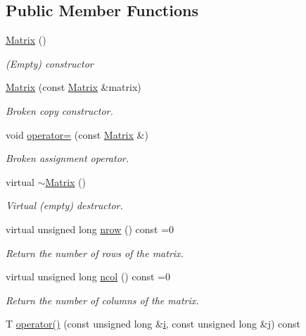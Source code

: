\subsection*{Public Member Functions}
\begin{DoxyCompactItemize}
\item 
\hyperlink{classoomph_1_1Matrix_ab414a0bf8e2658fc30d2c516f3bf4837}{Matrix} ()
\begin{DoxyCompactList}\small\item\em (Empty) constructor \end{DoxyCompactList}\item 
\hyperlink{classoomph_1_1Matrix_af6fb4df80b38414670a17080ca25aa4b}{Matrix} (const \hyperlink{classoomph_1_1Matrix}{Matrix} \&matrix)
\begin{DoxyCompactList}\small\item\em Broken copy constructor. \end{DoxyCompactList}\item 
void \hyperlink{classoomph_1_1Matrix_a9220e1bb01e5c77c4d4c2e6cb6865277}{operator=} (const \hyperlink{classoomph_1_1Matrix}{Matrix} \&)
\begin{DoxyCompactList}\small\item\em Broken assignment operator. \end{DoxyCompactList}\item 
virtual \hyperlink{classoomph_1_1Matrix_a3bc2eeb0940268de5252a9234d126f11}{$\sim$\+Matrix} ()
\begin{DoxyCompactList}\small\item\em Virtual (empty) destructor. \end{DoxyCompactList}\item 
virtual unsigned long \hyperlink{classoomph_1_1Matrix_ac366ca5324d3e00e23d9800f3d5f4d5f}{nrow} () const =0
\begin{DoxyCompactList}\small\item\em Return the number of rows of the matrix. \end{DoxyCompactList}\item 
virtual unsigned long \hyperlink{classoomph_1_1Matrix_ad1af46b34096c348272b0dfacb5ce6a9}{ncol} () const =0
\begin{DoxyCompactList}\small\item\em Return the number of columns of the matrix. \end{DoxyCompactList}\item 
T \hyperlink{classoomph_1_1Matrix_a26f23d2b331cb7f533fd8585f1ef8d28}{operator()} (const unsigned long \&\hyperlink{cfortran_8h_adb50e893b86b3e55e751a42eab3cba82}{i}, const unsigned long \&j) const

\end{DoxyCompactItemize}
